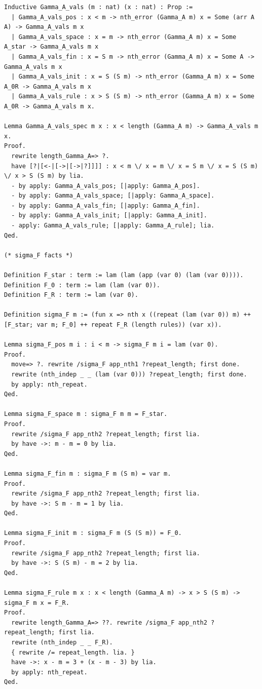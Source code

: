 \documentclass[10pt,a4paper]{amsart}
\begin{document}
\begin{lstlisting}
Inductive Gamma_A_vals (m : nat) (x : nat) : Prop :=
  | Gamma_A_vals_pos : x < m -> nth_error (Gamma_A m) x = Some (arr A A) -> Gamma_A_vals m x
  | Gamma_A_vals_space : x = m -> nth_error (Gamma_A m) x = Some A_star -> Gamma_A_vals m x
  | Gamma_A_vals_fin : x = S m -> nth_error (Gamma_A m) x = Some A -> Gamma_A_vals m x
  | Gamma_A_vals_init : x = S (S m) -> nth_error (Gamma_A m) x = Some A_0R -> Gamma_A_vals m x
  | Gamma_A_vals_rule : x > S (S m) -> nth_error (Gamma_A m) x = Some A_0R -> Gamma_A_vals m x.

Lemma Gamma_A_vals_spec m x : x < length (Gamma_A m) -> Gamma_A_vals m x.
Proof.
  rewrite length_Gamma_A=> ?.
  have [?|[<-|[->|[->|?]]]] : x < m \/ x = m \/ x = S m \/ x = S (S m) \/ x > S (S m) by lia.
  - by apply: Gamma_A_vals_pos; [|apply: Gamma_A_pos].
  - by apply: Gamma_A_vals_space; [|apply: Gamma_A_space].
  - by apply: Gamma_A_vals_fin; [|apply: Gamma_A_fin].
  - by apply: Gamma_A_vals_init; [|apply: Gamma_A_init].
  - apply: Gamma_A_vals_rule; [|apply: Gamma_A_rule]; lia.
Qed.

(* sigma_F facts *)

Definition F_star : term := lam (lam (app (var 0) (lam (var 0)))).
Definition F_0 : term := lam (lam (var 0)).
Definition F_R : term := lam (var 0).

Definition sigma_F m := (fun x => nth x ((repeat (lam (var 0)) m) ++ [F_star; var m; F_0] ++ repeat F_R (length rules)) (var x)).

Lemma sigma_F_pos m i : i < m -> sigma_F m i = lam (var 0).
Proof.
  move=> ?. rewrite /sigma_F app_nth1 ?repeat_length; first done.
  rewrite (nth_indep _ _ (lam (var 0))) ?repeat_length; first done.
  by apply: nth_repeat.
Qed.

Lemma sigma_F_space m : sigma_F m m = F_star.
Proof.
  rewrite /sigma_F app_nth2 ?repeat_length; first lia.
  by have ->: m - m = 0 by lia.
Qed.

Lemma sigma_F_fin m : sigma_F m (S m) = var m.
Proof.
  rewrite /sigma_F app_nth2 ?repeat_length; first lia.
  by have ->: S m - m = 1 by lia.
Qed.

Lemma sigma_F_init m : sigma_F m (S (S m)) = F_0.
Proof.
  rewrite /sigma_F app_nth2 ?repeat_length; first lia.
  by have ->: S (S m) - m = 2 by lia.
Qed.

Lemma sigma_F_rule m x : x < length (Gamma_A m) -> x > S (S m) -> sigma_F m x = F_R.
Proof.
  rewrite length_Gamma_A=> ??. rewrite /sigma_F app_nth2 ?repeat_length; first lia.
  rewrite (nth_indep _ _ F_R).
  { rewrite /= repeat_length. lia. }
  have ->: x - m = 3 + (x - m - 3) by lia.
  by apply: nth_repeat.
Qed.


\end{lstlisting}
\end{document}

